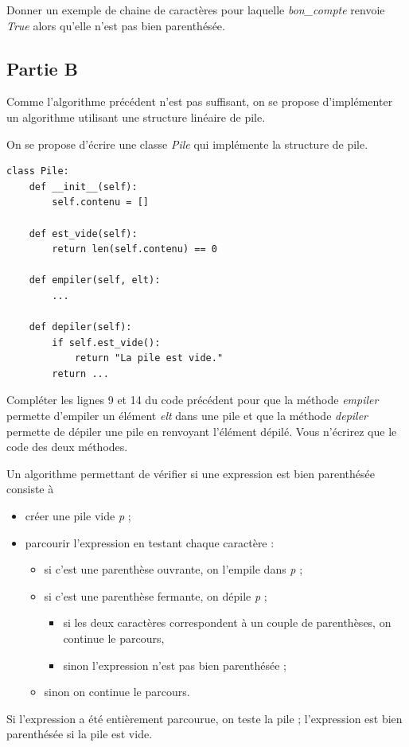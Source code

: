 \documentclass[a4paper, noanswers, addpoints, 12pt]{exam}
\begin{document}
\begin{questions}
\question[1] Donner un exemple de chaine de caractères pour laquelle \textit{bon\_compte} renvoie \textit{True} alors qu'elle n'est pas bien parenthésée.

\subsection*{Partie B}
Comme l'algorithme précédent n'est pas suffisant, on se propose d'implémenter un algorithme utilisant une structure linéaire de pile.

On se propose d'écrire une classe \textit{Pile} qui implémente la structure de pile.
\par\noindent\begin{minipage}{\linewidth}
\begin{lstlisting}
class Pile:
    def __init__(self):
        self.contenu = []

    def est_vide(self):
        return len(self.contenu) == 0

    def empiler(self, elt):
        ...

    def depiler(self):
        if self.est_vide():
            return "La pile est vide."
        return ...
\end{lstlisting}
\end{minipage}\par

\question[1\half] Compléter les lignes 9 et 14 du code précédent pour que la méthode \textit{empiler} permette d'empiler un élément \textit{elt} dans une pile et que la méthode \textit{depiler} permette de dépiler une pile en renvoyant l'élément dépilé. Vous n'écrirez que le code des deux méthodes.

Un algorithme permettant de vérifier si une expression est bien parenthésée consiste à
\begin{itemize}
\item créer une pile vide \textit{p} ;
\item parcourir l'expression en testant chaque caractère :
  \begin{itemize}
  \item si c'est une parenthèse ouvrante, on l'empile dans \textit{p} ;
  \item si c'est une parenthèse fermante, on dépile \textit{p} ;
    \begin{itemize}
    \item si les deux caractères correspondent à un couple de parenthèses, on continue le parcours,
    \item sinon l'expression n'est pas bien parenthésée ;
    \end{itemize}
  \item sinon on continue le parcours.
  \end{itemize}
\end{itemize}
Si l'expression a été entièrement parcourue, on teste la pile ; l'expression est bien parenthésée si la pile est vide.


\end{questions}
\end{document}
